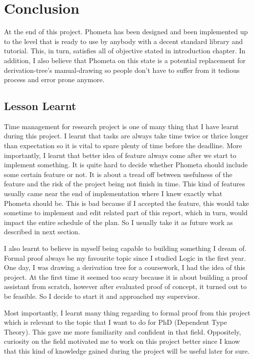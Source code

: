 \documentclass[master.tex]{subfiles}
\begin{document}
\chapter{Conclusion}

At the end of this project. Phometa has been designed and been implemented up to
the level that is ready to use by anybody with a decent standard library and
tutorial. This, in turn, satisfies all of objective stated in introduction
chapter. In addition, I also believe that Phometa on this state is a potential
replacement for derivation-tree's manual-drawing so people don't have to suffer
from it tedious process and error prone anymore.

\section{Lesson Learnt}

Time management for research project is one of many thing that I have learnt
during this project. I learnt that tasks are always take time twice or thrice
longer than expectation so it is vital to spare plenty of time before the
deadline. More importantly, I learnt that better idea of feature always come
after we start to implement something. It is quite hard to decide whether
Phometa should include some certain feature or not. It is about a tread off
between usefulness of the feature and the risk of the project being not finish
in time. This kind of features usually came near the end of implementation where
I knew exactly what Phometa should be. This is bad because if I accepted the
feature, this would take sometime to implement and edit related part of this
report, which in turn, would impact the entire schedule of the plan. So I
usually take it as future work as described in next section.

I also learnt to believe in myself being capable to building something I dream
of. Formal proof always be my favourite topic since I studied Logic in the first
year. One day, I was drawing a derivation tree for a coursework, I had the idea
of this project. At the first time it seemed too scary because it is about
building a proof assistant from scratch, however after evaluated proof of
concept, it turned out to be feasible. So I decide to start it and approached my
supervisor.

Most importantly, I learnt many thing regarding to formal proof from this
project which is relevant to the topic that I want to do for PhD (Dependent Type
Theory). This gave me more familiarity and confident in that field. Oppositely,
curiosity on the field motivated me to work on this project better since I know
that this kind of knowledge gained during the project will be useful later for
sure.
\end{document}
